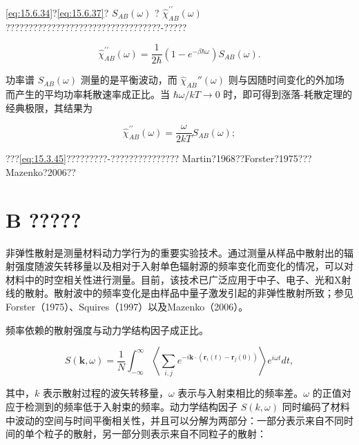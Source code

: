 \autoref{eq:15.6.34}?\autoref{eq:15.6.37}? \(S_{AB}(\omega)\) ? \(\hat{\chi}_{AB}^{\prime\prime}(\omega)\) ??????????????????????????????????-?????

\begin{equation}\tag{15.6.16}\label{eq:15.6.16}
\hat { \chi } _ { A B } ^{\prime \prime} ( \omega ) = \frac { 1 } { 2 \hbar } \left( 1 - e ^{- \beta \hbar \omega} \right) S _ { A B } ( \omega ) .
\end{equation}

功率谱 \(S_{AB}(\omega)\) 测量的是平衡波动，而 \(\hat{\chi}_{AB}''(\omega)\) 则与因随时间变化的外加场而产生的平均功率耗散速率成正比。当 \(\hbar\omega/kT\to0\) 时，即可得到涨落-耗散定理的经典极限，其结果为

\begin{equation}\tag{15.6.17}\label{eq:15.6.17}
\hat { \chi } _ { A B } ^{\prime \prime} ( \omega ) = \frac { \omega } { 2 k T } S _ { A B } ( \omega ) ;
\end{equation}

???\autoref{eq:15.3.45}?????????-??????????????? Martin?1968??Forster?1975??? Mazenko?2006??

\section{B ?????}\label{b-ux975eux5f39ux6027ux6563ux5c04}

非弹性散射是测量材料动力学行为的重要实验技术。通过测量从样品中散射出的辐射强度随波矢转移量以及相对于入射单色辐射源的频率变化而变化的情况，可以对材料中的时空相关性进行测量。目前，该技术已广泛应用于中子、电子、光和X射线的散射。散射波中的频率变化是由样品中量子激发引起的非弹性散射所致；参见Forster（1975）、Squires（1997）以及Mazenko（2006）。

频率依赖的散射强度与动力学结构因子成正比。

\begin{equation}\tag{15.6.18}\label{eq:15.6.18}
S ( \pmb { k } , \omega ) = \frac { 1 } { N } \int _ { - \infty } ^{\infty} \left\langle \sum _ { i , j } e ^{- i \pmb { k} \cdot ( \pmb { r } _ { i } ( t ) - \pmb { r } _ { j } ( 0 ) ) } \right\rangle e ^{i \omega t} d t ,
\end{equation}

其中，\(k\) 表示散射过程的波矢转移量，\(\omega\) 表示与入射束相比的频率差。\(\omega\) 的正值对应于检测到的频率低于入射束的频率。动力学结构因子 \(S(k,\omega)\) 同时编码了材料中波动的空间与时间平衡相关性，并且可以分解为两部分：一部分表示来自不同时间的单个粒子的散射，另一部分则表示来自不同粒子的散射：

